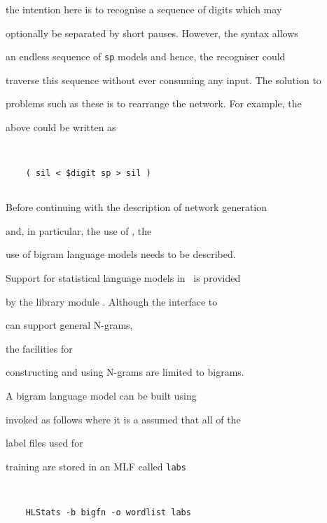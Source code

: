 the intention here is to recognise a sequence of digits which may


optionally be separated by short pauses.  However, the syntax allows


an endless sequence of \texttt{sp} models and hence, the recogniser could


traverse this sequence without ever consuming any input.  The solution to


problems such as these is to rearrange the network.  For example, the


above could be written as


\begin{verbatim}


    ( sil < $digit sp > sil )


\end{verbatim}














Before continuing with the description of network generation


and, in particular, the use of , the 


use of bigram language models needs to be described.


Support for statistical language models in \HTK\ is provided


by the library module .  Although the interface to


 can support general N-grams,  


the facilities for


constructing and using N-grams are limited to bigrams.





A bigram language model can be built using 


invoked as follows where it is a assumed that all of the


label files used for


training are stored in an MLF called \texttt{labs}


\begin{verbatim}


    HLStats -b bigfn -o wordlist labs


\end{verbatim}


